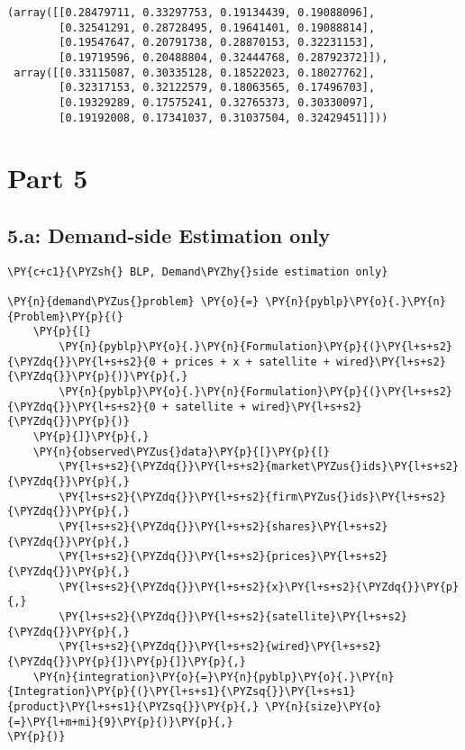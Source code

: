             \begin{tcolorbox}[breakable, size=fbox, boxrule=.5pt, pad at break*=1mm, opacityfill=0]
\begin{Verbatim}[commandchars=\\\{\}]
(array([[0.28479711, 0.33297753, 0.19134439, 0.19088096],
        [0.32541291, 0.28728495, 0.19641401, 0.19088814],
        [0.19547647, 0.20791738, 0.28870153, 0.32231153],
        [0.19719596, 0.20488804, 0.32444768, 0.28792372]]),
 array([[0.33115087, 0.30335128, 0.18522023, 0.18027762],
        [0.32317153, 0.32122579, 0.18063565, 0.17496703],
        [0.19329289, 0.17575241, 0.32765373, 0.30330097],
        [0.19192008, 0.17341037, 0.31037504, 0.32429451]]))
\end{Verbatim}
\end{tcolorbox}

    \hypertarget{part-5}{%
\section{Part 5}\label{part-5}}

    \hypertarget{a-demand-side-estimation-only}{%
\subsection{5.a: Demand-side Estimation
only}\label{a-demand-side-estimation-only}}

    \begin{tcolorbox}[breakable, size=fbox, boxrule=1pt, pad at break*=1mm,colback=cellbackground, colframe=cellborder]
\begin{Verbatim}[commandchars=\\\{\}]
\PY{c+c1}{\PYZsh{} BLP, Demand\PYZhy{}side estimation only}

\PY{n}{demand\PYZus{}problem} \PY{o}{=} \PY{n}{pyblp}\PY{o}{.}\PY{n}{Problem}\PY{p}{(}
    \PY{p}{[}
        \PY{n}{pyblp}\PY{o}{.}\PY{n}{Formulation}\PY{p}{(}\PY{l+s+s2}{\PYZdq{}}\PY{l+s+s2}{0 + prices + x + satellite + wired}\PY{l+s+s2}{\PYZdq{}}\PY{p}{)}\PY{p}{,}
        \PY{n}{pyblp}\PY{o}{.}\PY{n}{Formulation}\PY{p}{(}\PY{l+s+s2}{\PYZdq{}}\PY{l+s+s2}{0 + satellite + wired}\PY{l+s+s2}{\PYZdq{}}\PY{p}{)}
    \PY{p}{]}\PY{p}{,}
    \PY{n}{observed\PYZus{}data}\PY{p}{[}\PY{p}{[}
        \PY{l+s+s2}{\PYZdq{}}\PY{l+s+s2}{market\PYZus{}ids}\PY{l+s+s2}{\PYZdq{}}\PY{p}{,}
        \PY{l+s+s2}{\PYZdq{}}\PY{l+s+s2}{firm\PYZus{}ids}\PY{l+s+s2}{\PYZdq{}}\PY{p}{,}
        \PY{l+s+s2}{\PYZdq{}}\PY{l+s+s2}{shares}\PY{l+s+s2}{\PYZdq{}}\PY{p}{,}
        \PY{l+s+s2}{\PYZdq{}}\PY{l+s+s2}{prices}\PY{l+s+s2}{\PYZdq{}}\PY{p}{,}
        \PY{l+s+s2}{\PYZdq{}}\PY{l+s+s2}{x}\PY{l+s+s2}{\PYZdq{}}\PY{p}{,}
        \PY{l+s+s2}{\PYZdq{}}\PY{l+s+s2}{satellite}\PY{l+s+s2}{\PYZdq{}}\PY{p}{,}
        \PY{l+s+s2}{\PYZdq{}}\PY{l+s+s2}{wired}\PY{l+s+s2}{\PYZdq{}}\PY{p}{]}\PY{p}{]}\PY{p}{,}
    \PY{n}{integration}\PY{o}{=}\PY{n}{pyblp}\PY{o}{.}\PY{n}{Integration}\PY{p}{(}\PY{l+s+s1}{\PYZsq{}}\PY{l+s+s1}{product}\PY{l+s+s1}{\PYZsq{}}\PY{p}{,} \PY{n}{size}\PY{o}{=}\PY{l+m+mi}{9}\PY{p}{)}\PY{p}{,}
\PY{p}{)}
\end{Verbatim}
\end{tcolorbox}

